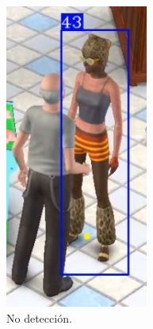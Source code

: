 \begin{figure}[!htpb]
\begin{subfigure}[b]{0.3\textwidth}
         \includegraphics[width=.65\textwidth]{./Figures/fallasDetector2.jpg}
         \caption{No detección.}
         \label{fig:fallasDetector2de3}
     \end{subfigure}
     \hfill
     \begin{subfigure}[b]{0.3\textwidth}
         \centering

\end{subfigure}
\end{figure}

